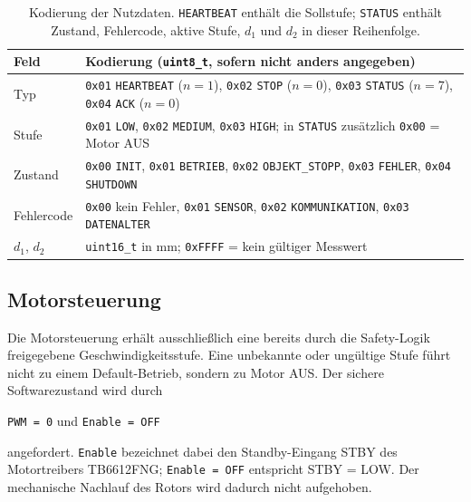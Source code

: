\begin{table}[H]
    \centering
    \small
    \begin{tabularx}{\textwidth}{@{}p{2.2cm}Y@{}}
        \toprule
        \textbf{Feld} & \textbf{Kodierung (\texttt{uint8\_t}, sofern nicht anders angegeben)} \\
        \midrule
        Typ & \texttt{0x01} \texttt{HEARTBEAT} ($n=1$), \texttt{0x02} \texttt{STOP} ($n=0$), \texttt{0x03} \texttt{STATUS} ($n=7$), \texttt{0x04} \texttt{ACK} ($n=0$) \\
        Stufe & \texttt{0x01} \texttt{LOW}, \texttt{0x02} \texttt{MEDIUM}, \texttt{0x03} \texttt{HIGH}; in \texttt{STATUS} zusätzlich \texttt{0x00} = Motor AUS \\
        Zustand & \texttt{0x00} \texttt{INIT}, \texttt{0x01} \texttt{BETRIEB}, \texttt{0x02} \texttt{OBJEKT\_STOPP}, \texttt{0x03} \texttt{FEHLER}, \texttt{0x04} \texttt{SHUTDOWN} \\
        Fehlercode & \texttt{0x00} kein Fehler, \texttt{0x01} \texttt{SENSOR}, \texttt{0x02} \texttt{KOMMUNIKATION}, \texttt{0x03} \texttt{DATENALTER} \\
        $d_1$, $d_2$ & \texttt{uint16\_t} in mm; \texttt{0xFFFF} = kein gültiger Messwert \\
        \bottomrule
    \end{tabularx}
    \caption{Kodierung der Nutzdaten. \texttt{HEARTBEAT} enthält die Sollstufe;
    \texttt{STATUS} enthält Zustand, Fehlercode, aktive Stufe, $d_1$ und $d_2$ in
    dieser Reihenfolge.}
    \label{tab:kodierung}
\end{table}

\subsection{Motorsteuerung}

Die Motorsteuerung erhält ausschließlich eine bereits durch die Safety-Logik
freigegebene Geschwindigkeitsstufe. Eine unbekannte oder ungültige Stufe führt
nicht zu einem Default-Betrieb, sondern zu Motor AUS. Der sichere Softwarezustand
wird durch

\begin{center}
    \texttt{PWM = 0} und \texttt{Enable = OFF}
\end{center}

angefordert. \texttt{Enable} bezeichnet dabei den Standby-Eingang STBY des
Motortreibers TB6612FNG; \texttt{Enable = OFF} entspricht STBY = LOW. Der
mechanische Nachlauf des Rotors wird dadurch nicht aufgehoben.


